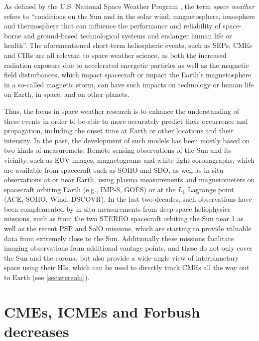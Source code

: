 As defined by the U.S. National Space Weather Program \parencite{OFCM-1995}, the term \textit{space weather} refers to ``conditions on the Sun and in the solar wind, magnetosphere, ionosphere and thermosphere that can influence the performance and reliability of space-borne and ground-based technological systems and endanger human life or health''.
The aforementioned short-term heliospheric events, such as \acp{SEP}, \acp{CME} and \acp{CIR} are all relevant to space weather science, as both the increased radiation exposure due to accelerated energetic particles as well as the magnetic field disturbances, which impact spacecraft or impact the Earth's magnetosphere in a so-called magnetic storm, can have such impacts on technology or human life on Earth, in space, and on other planets.

Thus, the focus in space weather research is to enhance the understanding of these events in order to be able to more accurately predict their occurrence and propagation, including the onset time at Earth or other locations and their intensity.
In the past, the development of such models has been mostly based on two kinds of measuremets: Remote-sensing observations of the Sun and its vicinity, such as \ac{EUV} images, magnetograms and white-light coronagraphs, which are available from spacecraft such as \acs{SOHO} and \acs{SDO}, as well as in situ observations at or near Earth, using plasma measurements and magnetometers on spacecraft orbiting Earth (e.g., IMP-8, GOES) or at the $L_1$ Lagrange point (\acs{ACE}, \acs{SOHO}, Wind, \acs{DSCOVR}).
In the last two decades, such observations have been complemented by in situ measurements from deep space heliophysics missions, such as from the two \ac{STEREO} spacecraft orbiting the Sun near \SI{1}{\AU} as well as the recent \ac{PSP} and \ac{SolO} missions, which are starting to provide valuable data from extremely close to the Sun. Additionally these missions facilitate imaging observations from additional vantage points, and these do not only cover the Sun and the corona, but also provide a wide-angle view of interplanetary space using their \acp{HI}, which can be used to directly track \acp{CME} all the way out to Earth (see \autoref{sec:stereohi}).

\section{CMEs, ICMEs and Forbush decreases}
\label{sec:cmes_forbush}

